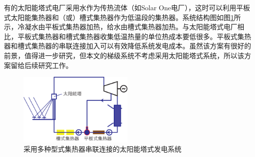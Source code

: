 有的太阳能塔式电厂采用水作为传热流体（如Solar One电厂），这时可以利用平板式太阳能集热器和（或）槽式集热器作为低温段的集热器。系统结构图如图\ref{fig:seriesCollection}所示，冷凝水由平板式集热器加热，给水由槽式集热器加热。与太阳能塔式电厂相比，平板式集热器和槽式集热器收集低温热量的单位热成本要低很多。平板式集热器和槽式集热器的串联连接加入可以有效降低系统发电成本。虽然该方案有很好的前景，值得进一步研究，但本文的梯级系统不考虑采用太阳能塔式系统，所以该方案留给后续研究工作。

\begin{figure}[!ht]
\centering 
\includegraphics[width=0.5\textwidth]{fig/SeriesCollection}
\caption{采用多种型式集热器串联连接的太阳能塔式发电系统}\label{fig:seriesCollection}
\end{figure}

